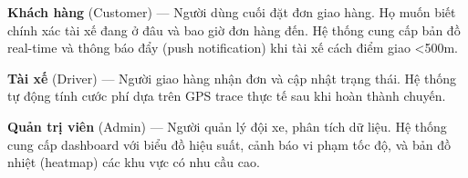 \bigskip
\noindent
\textbf{Khách hàng} (Customer) — Người dùng cuối đặt đơn giao hàng. Họ muốn biết chính xác tài xế đang ở đâu và bao giờ đơn hàng đến. Hệ thống cung cấp bản đồ real-time và thông báo đẩy (push notification) khi tài xế cách điểm giao <500m.

\bigskip
\noindent
\textbf{Tài xế} (Driver) — Người giao hàng nhận đơn và cập nhật trạng thái. Hệ thống tự động tính cước phí dựa trên GPS trace thực tế sau khi hoàn thành chuyến.

\bigskip
\noindent
\textbf{Quản trị viên} (Admin) — Người quản lý đội xe, phân tích dữ liệu. Hệ thống cung cấp dashboard với biểu đồ hiệu suất, cảnh báo vi phạm tốc độ, và bản đồ nhiệt (heatmap) các khu vực có nhu cầu cao.
